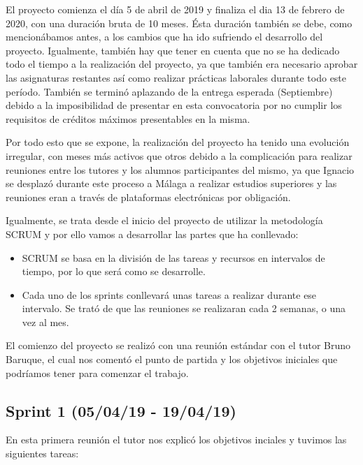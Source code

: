 El proyecto comienza el día 5 de abril de 2019 y finaliza el dia 13 de febrero de 2020, con una duración bruta de 10 meses. Ésta duración también se debe, como mencionábamos antes, a los cambios que ha ido sufriendo el desarrollo del proyecto. Igualmente, también hay que tener en cuenta que no se ha dedicado todo el tiempo a la realización del proyecto, ya que también era necesario aprobar las asignaturas restantes así como realizar prácticas laborales durante todo este período. También se terminó aplazando de la entrega esperada (Septiembre) debido a la imposibilidad de presentar en esta convocatoria por no cumplir los requisitos de créditos máximos presentables en la misma.

Por todo esto que se expone, la realización del proyecto ha tenido una evolución irregular, con meses más activos que otros debido a la complicación para realizar reuniones entre los tutores y los alumnos participantes del mismo, ya que Ignacio se desplazó durante este proceso a Málaga a realizar estudios superiores y las reuniones eran a través de plataformas electrónicas por obligación.

Igualmente, se trata desde el inicio del proyecto de utilizar la metodología SCRUM y por ello vamos a desarrollar las partes que ha conllevado:

\begin{itemize}

\item SCRUM se basa en la división de las tareas y recursos en intervalos de tiempo, por lo que será como se desarrolle. 

\item Cada uno de los sprints conllevará unas tareas a realizar durante ese intervalo. Se trató de que las reuniones se realizaran cada 2 semanas, o una vez al mes.

\end{itemize}

El comienzo del proyecto se realizó con una reunión estándar con el tutor Bruno Baruque, el cual nos comentó el punto de partida y los objetivos iniciales que podríamos tener para comenzar el trabajo.

\subsection{Sprint 1 (05/04/19 - 19/04/19)}

En esta primera reunión el tutor nos explicó los objetivos inciales y tuvimos las siguientes tareas:

